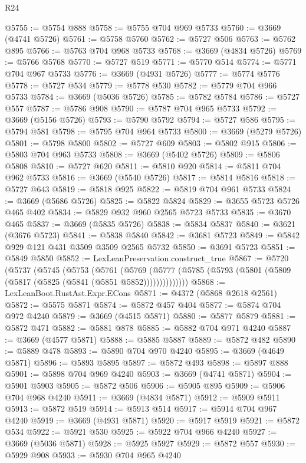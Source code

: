 \begin{lexlean}{R24}
\begin{coremodule}
@5755 := @5754 @888
@5758 := @5755 @704 @969 @5733
@5760 := @3669 (@4741 @5726)
@5761 := @5758 @5760
@5762 := @5727 @506
@5763 := @5762 @895
@5766 := @5763 @704 @968 @5733
@5768 := @3669 (@4834 @5726)
@5769 := @5766 @5768
@5770 := @5727 @519
@5771 := @5770 @514
@5774 := @5771 @704 @967 @5733
@5776 := @3669 (@4931 @5726)
@5777 := @5774 @5776
@5778 := @5727 @534
@5779 := @5778 @530
@5782 := @5779 @704 @966 @5733
@5784 := @3669 (@5036 @5726)
@5785 := @5782 @5784
@5786 := @5727 @557
@5787 := @5786 @908
@5790 := @5787 @704 @965 @5733
@5792 := @3669 (@5156 @5726)
@5793 := @5790 @5792
@5794 := @5727 @586
@5795 := @5794 @581
@5798 := @5795 @704 @964 @5733
@5800 := @3669 (@5279 @5726)
@5801 := @5798 @5800
@5802 := @5727 @609
@5803 := @5802 @915
@5806 := @5803 @704 @963 @5733
@5808 := @3669 (@5402 @5726)
@5809 := @5806 @5808
@5810 := @5727 @620
@5811 := @5810 @920
@5814 := @5811 @704 @962 @5733
@5816 := @3669 (@5540 @5726)
@5817 := @5814 @5816
@5818 := @5727 @643
@5819 := @5818 @925
@5822 := @5819 @704 @961 @5733
@5824 := @3669 (@5686 @5726)
@5825 := @5822 @5824
@5829 := @3655 @5723 @5726 @465 @402
@5834 := @5829 @932 @960 @2565 @5723 @5733
@5835 := @3670 @465
@5837 := @3669 (@5835 @5726)
@5838 := @5834 @5837
@5840 := @3621 (@3676 @5723)
@5841 := @5838 @5840
@5842 := @3681 @5723
@5849 := @5842 @929 @121 @431 @3509 @3509 @2565 @5732
@5850 := @3691 @5723
@5851 := @5849 @5850
@5852 := LexLeanPreservation.construct_true
@5867 := @5720
    (@5737
      (@5745
        (@5753
          (@5761
            (@5769
              (@5777 (@5785 (@5793 (@5801 (@5809 (@5817 (@5825 (@5841 (@5851 @5852))))))))))))))
@5868 := LexLeanBoot.RustAst.Expr.ECons
@5871 := @4372 (@5868 @2618 @2561)
@5872 := @5575 @5871
@5874 := @5872 @457 @404
@5877 := @5874 @704 @972 @4240
@5879 := @3669 (@4515 @5871)
@5880 := @5877 @5879
@5881 := @5872 @471
@5882 := @5881 @878
@5885 := @5882 @704 @971 @4240
@5887 := @3669 (@4577 @5871)
@5888 := @5885 @5887
@5889 := @5872 @482
@5890 := @5889 @478
@5893 := @5890 @704 @970 @4240
@5895 := @3669 (@4649 @5871)
@5896 := @5893 @5895
@5897 := @5872 @493
@5898 := @5897 @888
@5901 := @5898 @704 @969 @4240
@5903 := @3669 (@4741 @5871)
@5904 := @5901 @5903
@5905 := @5872 @506
@5906 := @5905 @895
@5909 := @5906 @704 @968 @4240
@5911 := @3669 (@4834 @5871)
@5912 := @5909 @5911
@5913 := @5872 @519
@5914 := @5913 @514
@5917 := @5914 @704 @967 @4240
@5919 := @3669 (@4931 @5871)
@5920 := @5917 @5919
@5921 := @5872 @534
@5922 := @5921 @530
@5925 := @5922 @704 @966 @4240
@5927 := @3669 (@5036 @5871)
@5928 := @5925 @5927
@5929 := @5872 @557
@5930 := @5929 @908
@5933 := @5930 @704 @965 @4240

\end{coremodule}
\end{lexlean}
